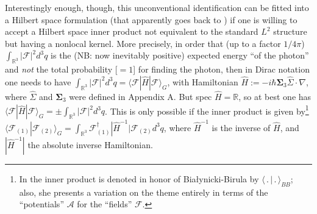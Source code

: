 \documentclass[11pt]{article}
\theoremstyle{definition}
\newcommand{\AV}{\pmb{\mathcal{A}}}
\newcommand{\FV}{\pmb{\mathcal{F}}}
\numberwithin{equation}{section}
\newcommand{\Rset}{{\mathbb R}}
\newcommand{\Si}{\Sigma}
\newcommand{\nab}{\nabla}
\begin{document}
 Interestingly enough, though, this unconventional identification can be fitted into a Hilbert space formulation (that apparently
goes back to \cite{Good1957}) if one is willing to accept a Hilbert space inner product not equivalent to the standard $L^2$ structure
but having a nonlocal kernel.
 More precisely, in order that (up to a factor $1/4\pi$) $\int_{\Rset^3}|\FV|^2d^3q$ is the (NB: now inevitably positive) expected energy 
``of the photon'' and \emph{not} the total probability [$=1$] for finding the photon, then in Dirac notation 
one needs to have $\int_{\Rset^3}|\FV|^2d^3q = \langle\FV|\hat{H}|\FV\rangle_{\!G}^{}$, 
with Hamiltonian $\hat{H} :=-i\hbar{\boldsymbol\Sigma}_3\widehat{\Si}\cdot\nab$, where $\widehat{\Si}$ 
and ${\boldsymbol\Sigma}_3$ were defined in Appendix A.
 But  spec $\hat{H} =\Rset$, so at best one has $\langle\FV|\hat{H}|\FV\rangle_{\!G}^{} = \pm \int_{\Rset^3}|\FV|^2d^3q$. 
 This is only possible if the inner product is given by\footnote{In \cite{Hawton} the inner product is denoted in honor 
   of Bia{\l}ynicki-Birula by $\langle\,.\,|\,.\,\rangle_{BB}^{}$;
   also, she presents a variation on the theme entirely in terms of the ``potentials'' $\AV$ for the ``fields'' $\FV$.} 
$\langle\FV_{(1)}|\FV_{(2)}\rangle_{\!G}^{} = \int_{\Rset^3} \FV_{(1)}^\dag |\hat{H}^{-1}|\FV_{(2)} d^3q$, 
where $\hat{H}^{-1}$ is the inverse of $\hat{H}$, and $|\hat{H}^{-1}|$ the absolute inverse Hamiltonian. 
 
\end{document}

